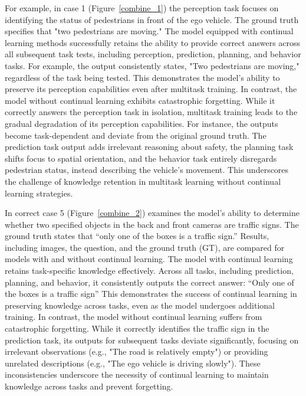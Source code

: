 For example, in case 1 (Figure~\ref{combine_1}) the perception task focuses on identifying the status of pedestrians in front of the ego vehicle. The ground truth specifies that "two pedestrians are moving." The model equipped with continual learning methods successfully retains the ability to provide correct answers across all subsequent task tests, including perception, prediction, planning, and behavior tasks. For example, the output consistently states, "Two pedestrians are moving," regardless of the task being tested. This demonstrates the model's ability to preserve its perception capabilities even after multitask training.
In contrast, the model without continual learning exhibits catastrophic forgetting. While it correctly answers the perception task in isolation, multitask training leads to the gradual degradation of its perception capabilities. For instance, the outputs become task-dependent and deviate from the original ground truth. The prediction task output adds irrelevant reasoning about safety, the planning task shifts focus to spatial orientation, and the behavior task entirely disregards pedestrian status, instead describing the vehicle's movement. This underscores the challenge of knowledge retention in multitask learning without continual learning strategies.

In correct case 5 (Figure~\ref{combine_2}) examines the model's ability to determine whether two specified objects in the back and front cameras are traffic signs. The ground truth states that ``only one of the boxes is a traffic sign.'' Results, including images, the question, and the ground truth (GT), are compared for models with and without continual learning.
The model with continual learning retains task-specific knowledge effectively. Across all tasks, including prediction, planning, and behavior, it consistently outputs the correct answer: ``Only one of the boxes is a traffic sign'' This demonstrates the success of continual learning in preserving knowledge across tasks, even as the model undergoes additional training.
In contrast, the model without continual learning suffers from catastrophic forgetting. While it correctly identifies the traffic sign in the prediction task, its outputs for subsequent tasks deviate significantly, focusing on irrelevant observations (e.g., "The road is relatively empty") or providing unrelated descriptions (e.g., "The ego vehicle is driving slowly"). These inconsistencies underscore the necessity of continual learning to maintain knowledge across tasks and prevent forgetting.

